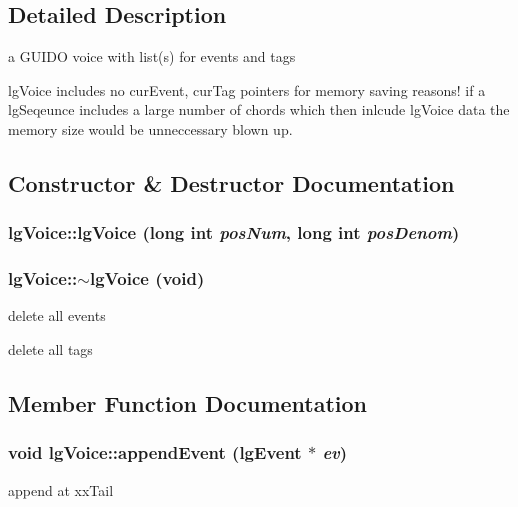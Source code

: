 \subsection{Detailed Description}
a GUIDO voice with list(s) for events and tags 

lg\-Voice includes no cur\-Event, cur\-Tag pointers for memory saving reasons! if a lg\-Seqeunce includes a large number of chords which then inlcude lg\-Voice data the memory size would be unneccessary blown up. 



\subsection{Constructor \& Destructor Documentation}
\subsubsection{\setlength{\rightskip}{0pt plus 5cm}lg\-Voice::lg\-Voice (long int {\em pos\-Num}, long int {\em pos\-Denom})}\label{classlgVoice_a6}


\subsubsection{\setlength{\rightskip}{0pt plus 5cm}lg\-Voice::$\sim${\bf lg\-Voice} (void)\hspace{0.3cm}{\tt  [virtual]}}\label{classlgVoice_a7}


delete all events

delete all tags 

\subsection{Member Function Documentation}
\subsubsection{\setlength{\rightskip}{0pt plus 5cm}void lg\-Voice::append\-Event ({\bf lg\-Event} $\ast$ {\em ev})}\label{classlgVoice_a8}


append at xx\-Tail 

